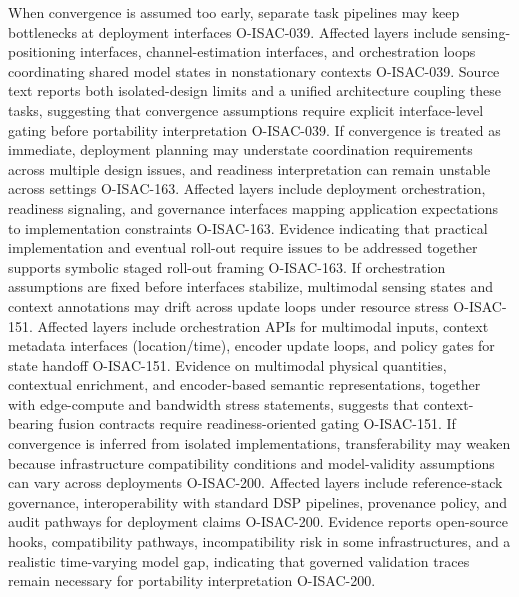 {}When convergence is assumed too early, separate task pipelines may keep bottlenecks at deployment interfaces O-ISAC-039. Affected layers include sensing-positioning interfaces, channel-estimation interfaces, and orchestration loops coordinating shared model states in nonstationary contexts O-ISAC-039. Source text reports both isolated-design limits and a unified architecture coupling these tasks, suggesting that convergence assumptions require explicit interface-level gating before portability interpretation O-ISAC-039.\markdownRendererInterblockSeparator
{}
\markdownRendererSectionEnd \markdownRendererSectionBegin
{}\markdownRendererInterblockSeparator
{}If convergence is treated as immediate, deployment planning may understate coordination requirements across multiple design issues, and readiness interpretation can remain unstable across settings O-ISAC-163. Affected layers include deployment orchestration, readiness signaling, and governance interfaces mapping application expectations to implementation constraints O-ISAC-163. Evidence indicating that practical implementation and eventual roll-out require issues to be addressed together supports symbolic staged roll-out framing O-ISAC-163.\markdownRendererInterblockSeparator
{}
\markdownRendererSectionEnd \markdownRendererSectionBegin
{}\markdownRendererInterblockSeparator
{}If orchestration assumptions are fixed before interfaces stabilize, multimodal sensing states and context annotations may drift across update loops under resource stress O-ISAC-151. Affected layers include orchestration APIs for multimodal inputs, context metadata interfaces (location/time), encoder update loops, and policy gates for state handoff O-ISAC-151. Evidence on multimodal physical quantities, contextual enrichment, and encoder-based semantic representations, together with edge-compute and bandwidth stress statements, suggests that context-bearing fusion contracts require readiness-oriented gating O-ISAC-151.\markdownRendererInterblockSeparator
{}
\markdownRendererSectionEnd \markdownRendererSectionBegin
{}\markdownRendererInterblockSeparator
{}If convergence is inferred from isolated implementations, transferability may weaken because infrastructure compatibility conditions and model-validity assumptions can vary across deployments O-ISAC-200. Affected layers include reference-stack governance, interoperability with standard DSP pipelines, provenance policy, and audit pathways for deployment claims O-ISAC-200. Evidence reports open-source hooks, compatibility pathways, incompatibility risk in some infrastructures, and a realistic time-varying model gap, indicating that governed validation traces remain necessary for portability interpretation O-ISAC-200.\markdownRendererInterblockSeparator

